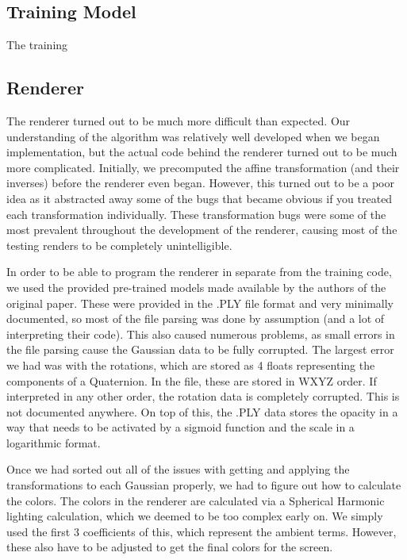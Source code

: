 \documentclass[12pt, a4paper, twocolumn]{article}
\begin{document}
\subsection{Training Model}

The training 

\subsection{Renderer}

The renderer turned out to be much more difficult than expected. Our understanding of the algorithm was relatively well developed when we began implementation, but the actual code behind the renderer turned out to be much more complicated. Initially, we precomputed the affine transformation (and their inverses) before the renderer even began. However, this turned out to be a poor idea as it abstracted away some of the bugs that became obvious if you treated each transformation individually. These transformation bugs were some of the most prevalent throughout the development of the renderer, causing most of the testing renders to be completely unintelligible. 

In order to be able to program the renderer in separate from the training code, we used the provided pre-trained models made available by the authors of the original paper. These were provided in the .PLY file format and very minimally documented, so most of the file parsing was done by assumption (and a lot of interpreting their code). This also caused numerous problems, as small errors in the file parsing cause the Gaussian data to be fully corrupted. The largest error we had was with the rotations, which are stored as 4 floats representing the components of a Quaternion. In the file, these are stored in WXYZ order. If interpreted in any other order, the rotation data is completely corrupted. This is not documented anywhere. On top of this, the .PLY data stores the opacity in a way that needs to be activated by a sigmoid function and the scale in a logarithmic format. 

Once we had sorted out all of the issues with getting and applying the transformations to each Gaussian properly, we had to figure out how to calculate the colors. The colors in the renderer are calculated via a Spherical Harmonic lighting calculation, which we deemed to be too complex early on. We simply used the first 3 coefficients of this, which represent the ambient terms. However, these also have to be adjusted to get the final colors for the screen.
\end{document}
